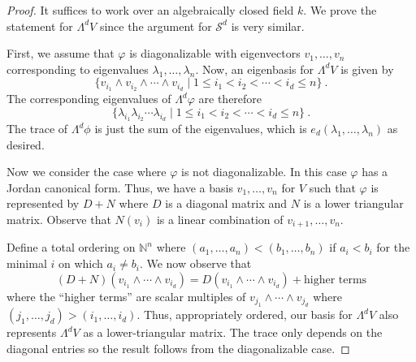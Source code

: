 \documentclass[12pt]{article}
\theoremstyle{plain}
\theoremstyle{definition}
\theoremstyle{remark}
\numberwithin{equation}{section}
\begin{document}
\begin{proof}
It suffices to work over an algebraically closed field $k$.
We prove the statement for $\Lambda^d V$ since the argument for
$\mathcal{S}^d$ is very similar. 

First, we assume that $\varphi$ is diagonalizable with eigenvectors
$v_1,\ldots, v_n$ corresponding to eigenvalues
$\lambda_1,\ldots,\lambda_n$.
Now, an eigenbasis for $\Lambda^d V$ is given by
\[
\{ v_{i_1}\wedge v_{i_2}\wedge \cdots \wedge v_{i_d} \mid
1 \le i_1 < i_2 < \cdots < i_d \le n \} \ .
\]
The corresponding eigenvalues of $\Lambda^d \varphi$ are therefore
\[
\{ \lambda_{i_1} \lambda_{i_2} \cdots \lambda_{i_d} \mid
1 \le i_1 < i_2 < \cdots < i_d \le n \} \ .
\]
The trace of $\Lambda^d \phi$ is just the sum of the eigenvalues, which
is $e_d(\lambda_1,\ldots,\lambda_n)$ as desired.

Now we consider the case where $\varphi$ is not diagonalizable.
In this case $\varphi$ has a Jordan canonical form.  Thus,
we have a basis $v_1,\ldots, v_n$ for $V$ such that $\varphi$ is
represented by $D+N$ where $D$ is a diagonal matrix and
$N$ is a lower triangular matrix.
Observe that $N(v_i)$ is a linear combination of $v_{i+1},\ldots, v_n$.

Define a total ordering on $\mathbb{N}^n$ where
$(a_1,\ldots,a_n) < (b_1,\ldots,b_n)$ if $a_i < b_i$ for the minimal $i$
on which $a_i \ne b_i$.
We now observe that
\[
(D+N)(v_{i_1}\wedge \cdots \wedge v_{i_d})
= D(v_{i_1}\wedge \cdots \wedge v_{i_d})
+ \textrm{higher terms} 
\]
where the ``higher terms'' are scalar multiples of
$v_{j_1}\wedge \cdots \wedge v_{j_d}$
where $(j_1,\ldots,j_d) > (i_1,\ldots,i_d)$.
Thus, appropriately ordered, our basis for $\Lambda^d V$
also represents $\Lambda^d V$ as a lower-triangular matrix.
The trace only depends on the diagonal entries so the result follows
from the diagonalizable case.
\end{proof}




\end{document}
